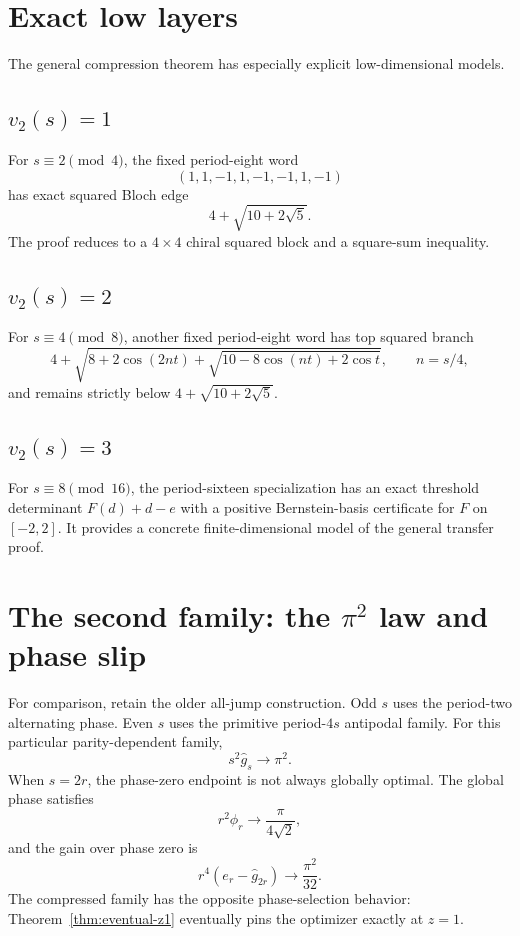 \documentclass[11pt]{article}
\theoremstyle{remark}
\newcommand{\vTwo}{v_2}
\begin{document}
\section{Exact low layers}
\label{sec:low-layers}

The general compression theorem has especially explicit low-dimensional
models.

\subsection{$\vTwo(s)=1$}
For $s\equiv2\pmod4$, the fixed period-eight word
\[
 (1,1,-1,1,-1,-1,1,-1)
\]
has exact squared Bloch edge
\[
 4+\sqrt{10+2\sqrt5}.
\]
The proof reduces to a $4\times4$ chiral squared block and a square-sum
inequality.

\subsection{$\vTwo(s)=2$}
For $s\equiv4\pmod8$, another fixed period-eight word has top squared branch
\[
 4+\sqrt{
 8+2\cos(2nt)+\sqrt{10-8\cos(nt)+2\cos t}},
 \qquad n=s/4,
\]
and remains strictly below $4+\sqrt{10+2\sqrt5}$.

\subsection{$\vTwo(s)=3$}
For $s\equiv8\pmod{16}$, the period-sixteen specialization has an exact
threshold determinant $F(d)+d-e$ with a positive Bernstein-basis certificate
for $F$ on $[-2,2]$.  It provides a concrete finite-dimensional model of the
general transfer proof.

\section{The second family: the $\pi^2$ law and phase slip}
\label{sec:old-family}

For comparison, retain the older all-jump construction.  Odd $s$ uses the
period-two alternating phase.  Even $s$ uses the primitive period-$4s$
antipodal family.  For this particular parity-dependent family,
\[
 s^2\widehat g_s\to\pi^2.
\]
When $s=2r$, the phase-zero endpoint is not always globally optimal.  The
global phase satisfies
\[
 r^2\phi_r\to\frac{\pi}{4\sqrt2},
\]
and the gain over phase zero is
\[
 r^4(e_r-\widehat g_{2r})\to\frac{\pi^2}{32}.
\]
The compressed family has the opposite phase-selection behavior:
Theorem~\ref{thm:eventual-z1} eventually pins the optimizer exactly at
$z=1$.
\end{document}
